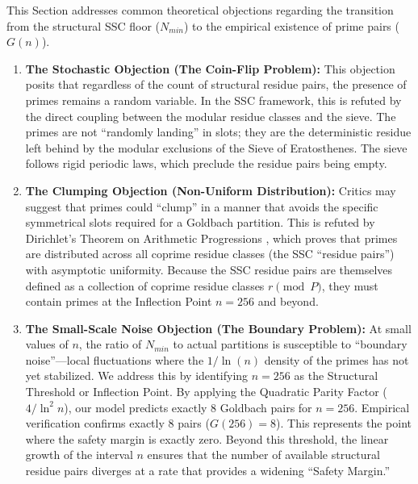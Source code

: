 \documentclass[sn-mathphys-num, pdflatex]{sn-jnl}
\begin{document}
This Section addresses common theoretical objections regarding the transition from the structural SSC floor ($N_{min}$) to the empirical existence of prime pairs ($G(n)$).

\begin{enumerate}
    \item \textbf{The Stochastic Objection (The Coin-Flip Problem):}
    This objection posits that regardless of the count of structural residue pairs, the presence of primes remains a random variable. In the SSC framework, this is refuted by the direct coupling between the modular residue classes and the sieve. The primes are not ``randomly landing'' in slots; they are the deterministic residue left behind by the modular exclusions of the Sieve of Eratosthenes. The sieve follows rigid periodic laws, which preclude the residue pairs being empty.
    
    \item \textbf{The Clumping Objection (Non-Uniform Distribution):}
    Critics may suggest that primes could ``clump'' in a manner that avoids the specific symmetrical slots required for a Goldbach partition. This is refuted by Dirichlet’s Theorem on Arithmetic Progressions \cite{dirichlet}, which proves that primes are distributed across all coprime residue classes (the SSC ``residue pairs'') with asymptotic uniformity. Because the SSC residue pairs are themselves defined as a collection of coprime residue classes $r \pmod{P}$, they must contain primes at the Inflection Point $n = 256$ and beyond. 

    \item \textbf{The Small-Scale Noise Objection (The Boundary Problem):}
    At small values of $n$, the ratio of $N_{min}$ to actual partitions is susceptible to ``boundary noise''—local fluctuations where the $1/\ln(n)$ density of the primes has not yet stabilized. We address this by identifying $n = 256$ as the Structural Threshold or Inflection Point. By applying the Quadratic Parity Factor ($4/\ln^2 n$), our model predicts exactly 8 Goldbach pairs for $n=256$. Empirical verification confirms exactly 8 pairs ($G(256)=8$). This represents the point where the safety margin is exactly zero. Beyond this threshold, the linear growth of the interval $n$ ensures that the number of available structural residue pairs diverges at a rate that provides a widening ``Safety Margin.''


\end{enumerate}
\end{document}
